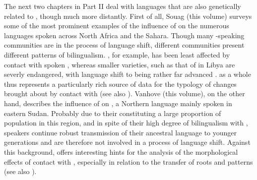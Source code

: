 \documentclass[output=paper]{langsci/langscibook}
\begin{document}
The next two chapters in Part II deal with languages that are also genetically related to , though much more distantly. First of all, Souag (this volume) surveys some of the most prominent examples of the influence of  on the numerous  languages spoken across North Africa and the Sahara. Though many -speaking communities are in the process of {language shift}, different communities present different patterns of {bilingualism}. , for example, has been least affected by contact with spoken , whereas smaller varieties, such as that of  in Libya are severly {endangered}, with {language shift} to  being rather far advanced \citep{vanPuttenSouag2015}.  as a whole thus represents a particularly rich source of data for the typology of changes brought about by contact with  (see also \citealt{Kossmann2013book}). Vanhove (this volume), on the other hand, describes the influence of  on , a {Northern}  language mainly spoken in eastern Sudan. Probably due to their constituting a large proportion of population in this region, and in spite of their high degree of {bilingualism} with  ,  speakers continue robust {transmission} of their ancestral language to younger generations and are therefore not involved in a process of {language shift}. Against this background,  offers interesting hints for the analysis of the morphological effects of contact with , especially in relation to the {transfer} of {roots} and patterns (see also \citealt{Vanhove2012}).
\end{document}
